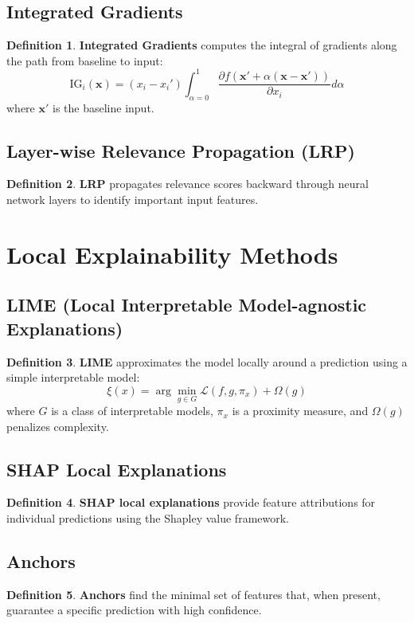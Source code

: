 \documentclass[11pt]{article}
\theoremstyle{definition}
\newtheorem{definition}{Definition}[section]
\begin{document}
\subsection{Integrated Gradients}
\begin{definition}
\textbf{Integrated Gradients} computes the integral of gradients along the path from baseline to input:
$$\text{IG}_i(\mathbf{x}) = (x_i - x_i')\int_{\alpha=0}^1 \frac{\partial f(\mathbf{x}' + \alpha(\mathbf{x} - \mathbf{x}'))}{\partial x_i} d\alpha$$
where $\mathbf{x}'$ is the baseline input.
\end{definition}

\subsection{Layer-wise Relevance Propagation (LRP)}
\begin{definition}
\textbf{LRP} propagates relevance scores backward through neural network layers to identify important input features.
\end{definition}

\section{Local Explainability Methods}

\subsection{LIME (Local Interpretable Model-agnostic Explanations)}
\begin{definition}
\textbf{LIME} approximates the model locally around a prediction using a simple interpretable model:
$$\xi(x) = \arg\min_{g \in G} \mathcal{L}(f, g, \pi_x) + \Omega(g)$$
where $G$ is a class of interpretable models, $\pi_x$ is a proximity measure, and $\Omega(g)$ penalizes complexity.
\end{definition}

\subsection{SHAP Local Explanations}
\begin{definition}
\textbf{SHAP local explanations} provide feature attributions for individual predictions using the Shapley value framework.
\end{definition}

\subsection{Anchors}
\begin{definition}
\textbf{Anchors} find the minimal set of features that, when present, guarantee a specific prediction with high confidence.
\end{definition}
\end{document}
